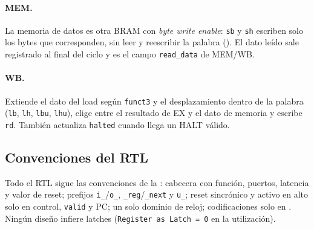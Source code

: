 \paragraph{MEM.} La memoria de datos es otra BRAM con \emph{byte write enable}: \texttt{sb} y
\texttt{sh} escriben solo los bytes que corresponden, sin leer y reescribir la palabra
(). El dato leído sale registrado al final del ciclo y es el campo
\texttt{read\_data} de MEM/WB.

\paragraph{WB.} Extiende el dato del load según \texttt{funct3} y el desplazamiento dentro de la
palabra (\texttt{lb}, \texttt{lh}, \texttt{lbu}, \texttt{lhu}), elige entre el resultado de EX y
el dato de memoria y escribe \texttt{rd}. También actualiza \texttt{halted} cuando llega un HALT
válido.

\subsection{Convenciones del RTL}

Todo el RTL sigue las convenciones de la : cabecera con función, puertos, latencia y
valor de reset; prefijos \texttt{i\_}/\texttt{o\_}, \texttt{\_reg}/\texttt{\_next} y \texttt{u\_};
reset sincrónico y activo en alto solo en control, \texttt{valid} y PC; un solo dominio de reloj;
codificaciones solo en . Ningún diseño infiere latches
(\texttt{Register as Latch = 0} en la utilización).
